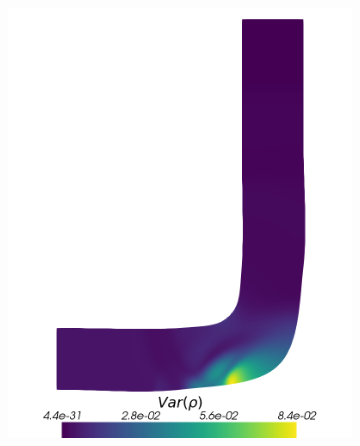 \begin{figure}[H]
\begin{subfigure}{0.3\linewidth}
		\includegraphics[scale=0.18]{figs/pipe/euler2D_pipe_adipm_n1-2_VarRho.png}
		\caption{}
		\label{fig:adIPMSolutionsPipeSGVar}
	\end{subfigure}
	\hfill
	\begin{subfigure}{0.3\linewidth}
		\centering

\end{subfigure}
\end{figure}
